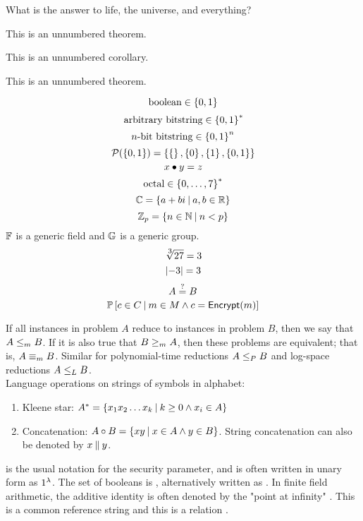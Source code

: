 \documentclass{article}
\begin{document}
\begin{problem}
    What is the answer to life, the universe, and everything?
\end{problem}
\begin{solution}
    \begin{theorem*}
        This is an unnumbered theorem.
    \end{theorem*}
    \begin{corollary*}
        This is an unnumbered corollary.
    \end{corollary*}
    \begin{lemma*}
        This is an unnumbered theorem.
    \end{lemma*}

    $$\str{boolean} \in \boolset$$
    $$\str{arbitrary bitstring} \in \bitsset$$
    $$n\str{-bit bitstring} \in \bitsset[n]$$
    $$\mathcal{P}(\left\{ 0,1 \right\}) = \left\{ \left\{  \right\}, \left\{ 0 \right\}, \left\{ 1 \right\}, \left\{ 0,1 \right\} \right\}$$
    $$x \mathbin{\bullet} y = z$$
    $$\str{octal} \in \lset{0}{7}^*$$
    $$\mathbb{C} = \left\{ a + bi \mathbin{\mid} a,b \in \mathbb{R} \right\}$$
    $$\mathbb{Z}_{p} = \left\{ n \in \mathbb{N} \mathbin{\mid} n < p \right\}$$
    $\mathbb{F}$ is a generic field and $\mathbb{G}$ is a generic group.\\
    $$\nthroot{3}{27} = 3$$
    $$\left| -3 \right| = 3$$
    $$ A \overset{?}{=} B$$
    $$\operatorname{\mathbb{P}}{[c \in C \mathbin{\mid} m \in M \land c = \mathsf{Encrypt}(m)]}$$

    If all instances in problem $A$ reduce to instances in problem $B$, then we say that $A \leq_m B$. If it is also true that $B \geq_m A$, then these problems are equivalent; that is, $A \equiv_m B$. Similar for polynomial-time reductions $A \leq_P B$ and log-space reductions $A \leq_L B$. \\

    Language operations on strings of symbols in alphabet:
    \begin{enumerate}
        \item Kleene star: ${A}^* = \left\{ x_1 x_2 \ldots x_k \mathbin{\mid} k \geq 0 \land x_i \in A \right\}$
        \item Concatenation: $A \mathbin{\circ} B = \left\{ xy \mathbin{\mid} x \in A \land y \in B \right\}$. String concatenation can also be denoted by $x \mathbin{\Vert} y$.
    \end{enumerate}

    \par \secparam is the usual notation for the security parameter, and is often written in unary form as $1^\lambda$. The set of booleans is \boolset, alternatively written as . In finite field arithmetic, the additive identity is often denoted by the "point at infinity" \inftypt. This is a common reference string \crs and this is a relation \rel{}.


\end{solution}
\end{document}
